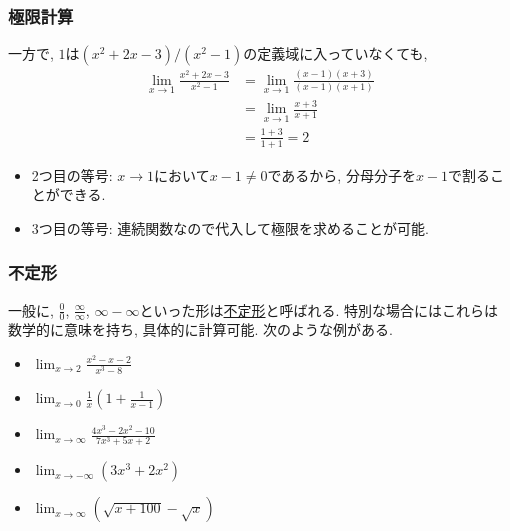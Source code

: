 \documentclass[dvipdfmx,cjk,10.2pt]{beamer}
\theoremstyle{definition}
\begin{document}


\begin{frame}
\frametitle{極限計算} 



一方で, $1$は$(x^2+2x-3)/(x^2-1)$の定義域に入っていなくても, 
\begin{align*}
\lim_{x \to 1} \frac{x^2+2x-3}{x^2-1} &= \lim_{x \to 1} \frac{(x-1)(x+3)}{(x-1)(x+1)} \\
& = \lim_{x \to 1} \frac{x+3}{x+1} \\
& =  \frac{1+3}{1+1} =2 
\end{align*}

\begin{itemize}
\item 2つ目の等号: $x \to 1$において$x-1\neq 0$であるから, 分母分子を$x-1$で割ることができる. 
\item 3つ目の等号: 連続関数なので代入して極限を求めることが可能. 
\end{itemize}


\end{frame}





\begin{frame}
\frametitle{不定形} 

一般に, $\frac{0}{0}$, $\frac{\infty}{\infty}$, $\infty - \infty$といった形は\underline{不定形}と呼ばれる. 
特別な場合にはこれらは数学的に意味を持ち, 具体的に計算可能. 
次のような例がある. 

\begin{itemize}
\item $\displaystyle \lim_{x\to 2} \frac{x^2-x-2}{x^3-8}$
\item $\displaystyle \lim_{x\to 0} \frac{1}{x}(1+\frac{1}{x-1})$
\item $\displaystyle \lim_{x \to \infty}\frac{4x^3-2x^2-10}{7x^3+5x+2}$
\item $\displaystyle \lim_{x\to -\infty} (3x^3+2x^2)$
\item $\displaystyle \lim_{x\to \infty} (\sqrt{x+100}-\sqrt{x})$
\end{itemize}


\end{frame}
\end{document}
